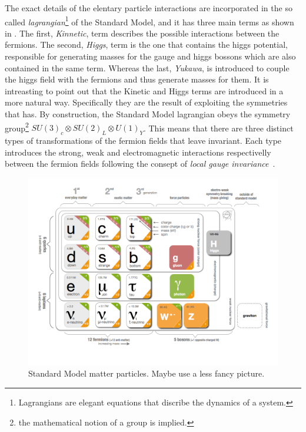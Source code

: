 The exact details of the elentary particle interactions are incorporated in the so called
{\it lagrangian}\footnote{ Lagrangians are elegant equations that discribe the dynamics of a system.} of the Standard Model,
 and it has three main terms as shown in . The first, {\it Kinnetic}, term describes the possible
interactions between the fermions. The second, {\it Higgs}, term is the one that contains the higgs potential, responsible for generating
masses for the gauge and higgs bossons which are also contained in the same term.
Whereas the last, {\it Yukawa}, is introduced to couple the higgs field with the fermions and thus generate masses for them.
It is intreasting to point out that the Kinetic and Higgs terms are introduced in a more natural way.
Specifically they are the result of exploiting the symmetries that  has.
By construction, the Standard Model lagrangian obeys the symmetry group\footnote{the mathematical notion of a group is implied.}
$SU(3)_c\otimes SU(2)_L\otimes U(1)_Y$. This means that there are three distinct types of transformations of the fermion fields that leave 
invariant. Each type introduces the strong, weak and electromagnetic interactions respectivelly between the
fermion fields following the consept of {\it local gauge invariance}~\cite{aitchison}.

\begin{figure}[h]
  \begin{center}
    \includegraphics[trim=1.4cm 0cm 5.95cm 0cm, clip=true, width=\textwidth]{Figures/Chapter1/Standard_model_infographic.png}
    \caption{Standard Model matter particles. {\color{red} Maybe use a less fancy picture.}}
    \label{sm_particles}
  \end{center}
\end{figure}

